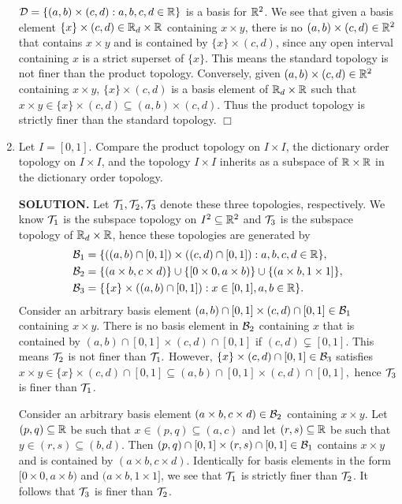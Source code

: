 \documentclass{article}
\begin{document}
\begin{enumerate}
        $\mathcal{D} = \{(a, b) \times (c, d): a, b, c,d\in \mathbb{R}\}$ is a basis for $\mathbb{R}^2$. We see that given a basis element $\{x\} \times (c, d) \in \mathbb{R}_d \times \mathbb{R}$ containing $x \times y$, there is no $(a, b) \times (c, d) \in \mathbb{R}^2$ that contains $x \times y$ and is contained by $\{x\} \times (c, d)$, since any open interval containing $x$ is a strict superset of $\{x\}$. This means the standard topology is not finer than the product topology. Conversely, given $(a, b) \times (c,d) \in \mathbb{R}^2$ containing $x \times y$, $\{x\} \times (c, d)$ is a basis element of $\mathbb{R}_d \times \mathbb{R}$ such that $x \times y \in \{x\} \times (c, d) \subseteq (a, b) \times (c, d)$. Thus the product topology is strictly finer than the standard topology. $\Box$ 

        \item Let $I = [0, 1]$. Compare the product topology on $I \times I$, the dictionary order topology on $I \times I$, and the topology $I \times I$ inherits as a subspace of $\mathbb{R} \times \mathbb{R}$ in the dictionary order topology. 

        {\bf SOLUTION.} Let $\mathcal{T}_1, \mathcal{T}_2, \mathcal{T}_3$ denote these three topologies, respectively. We know $\mathcal{T}_1$ is the subspace topology on $I^2 \subseteq \mathbb{R}^2$ and $\mathcal{T}_3$ is the subspace topology of $\mathbb{R}_d \times \mathbb{R}$, hence these topologies are generated by
        \begin{align*}
            \mathcal{B}_1 &= \{ ((a, b) \cap [0, 1]) \times ((c, d) \cap [0, 1]): a,b,c,d\in \mathbb{R}\}, \\
            \mathcal{B}_2 &= \{(a \times b, c \times d)\} \cup\{[0 \times 0, a\times b)\} \cup \{(a \times b, 1 \times 1]\}, \\
            \mathcal{B}_3 &= \{ \{x\} \times ((a, b) \cap [0, 1]) : x \in [0, 1], a,b \in \mathbb{R}\}.
        \end{align*}
        Consider an arbitrary basis element $(a, b) \cap [0, 1] \times (c, d) \cap [0, 1] \in \mathcal{B}_1$ containing $x \times y$. There is no basis element in $\mathcal{B}_2$ containing $x$ that is contained by $(a, b) \cap [0, 1] \times (c, d) \cap [0, 1]$ if $(c, d) \subsetneq [0, 1].$ This means $\mathcal{T}_2$ is not finer than $\mathcal{T}_1.$ However, $\{x \} \times (c, d) \cap [0, 1] \in \mathcal{B}_3$ satisfies $x \times y \in \{x \} \times (c, d) \cap [0, 1] \subseteq (a, b) \cap [0, 1] \times (c, d) \cap [0, 1],$ hence $\mathcal{T}_3$ is finer than $\mathcal{T}_1$.

        Consider an arbitrary basis element $(a \times b, c \times d) \in \mathcal{B}_2$ containing $x \times y$. Let $(p, q) \subseteq \mathbb{R}$ be such that $x \in (p, q) \subseteq (a, c)$ and let $(r, s) \subseteq \mathbb{R}$ be such that $y \in (r, s) \subseteq (b, d)$. Then $(p, q) \cap [0, 1] \times (r, s) \cap [0, 1] \in \mathcal{B}_1$ contains $x \times y$ and is contained by $(a \times b, c \times d)$. Identically for basis elements in the form $[0 \times 0, a\times b)$ and $(a \times b, 1 \times 1]$, we see that $\mathcal{T}_1$ is strictly finer than $\mathcal{T}_2$. It follows that $\mathcal{T}_3$ is finer than $\mathcal{T}_2$.


\end{enumerate}
\end{document}
